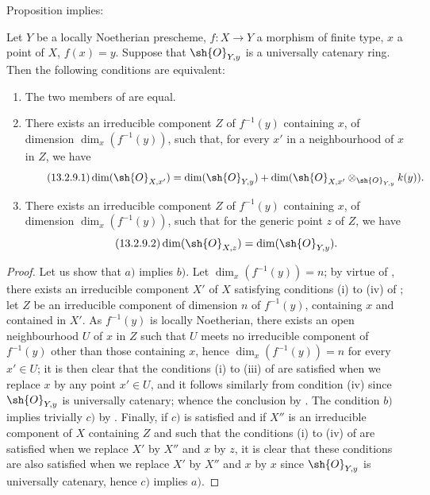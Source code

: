 Proposition  implies:

\begin{corollary}[13.2.9]
\label{IV.13.2.9}
Let $Y$ be a locally Noetherian prescheme, $f:X\to Y$ a morphism of finite type, $x$ a point of $X$, $f(x)=y$.
Suppose that $\sh{O}_{Y,y}$ is a universally catenary ring.
Then the following conditions are equivalent:
\begin{enumerate}[label=\emph{\alph*)}]
  \item The two members of  are equal.
  \item There exists an irreducible component $Z$ of $f^{-1}(y)$ containing $x$, of dimension $\dim_x(f^{-1}(y))$, such that, for every $x'$ in a neighbourhood of $x$ in $Z$, we have
  \[
  \tag{13.2.9.1}
    \dim(\sh{O}_{X,x'})=\dim(\sh{O}_{Y,y})+\dim(\sh{O}_{X,x'}\otimes_{\sh{O}_{Y,y}}k(y)).
  \]
  \item There exists an irreducible component $Z$ of $f^{-1}(y)$ containing $x$, of dimension $\dim_x(f^{-1}(y))$, such that for the generic point $z$ of $Z$, we have
  \[
  \tag{13.2.9.2}
    \dim(\sh{O}_{X,z})=\dim(\sh{O}_{Y,y}).
  \]
\end{enumerate}
\end{corollary}

\begin{proof}
Let us show that $a)$ implies $b)$.
Let $\dim_x(f^{-1}(y))=n$; by virtue of , there exists an irreducible component $X'$ of $X$ satisfying conditions (i) to (iv) of ; let $Z$ be an irreducible component of dimension $n$ of $f^{-1}(y)$, containing $x$ and contained in $X'$.
As $f^{-1}(y)$ is locally Noetherian, there exists an open neighbourhood $U$ of $x$ in $Z$ such that $U$ meets no irreducible component of $f^{-1}(y)$ other than those containing $x$, hence  $\dim_x(f^{-1}(y))=n$ for every $x'\in U$; it is then clear that the conditions (i) to (iii) of  are satisfied when we replace $x$ by any point $x'\in U$, and it follows similarly from condition (iv) since $\sh{O}_{Y,y}$ is universally catenary; whence the conclusion by .
The condition $b)$ implies trivially $c)$ by .
Finally, if $c)$ is satisfied and if $X''$ is an irreducible component of $X$ containing $Z$ and such that the conditions (i) to (iv) of  are satisfied when we replace $X'$ by $X''$ and $x$ by $z$, it is clear that these conditions are also satisfied when we replace $X'$ by $X''$ and $x$ by $x$ since $\sh{O}_{Y,y}$ is universally catenary, hence $c)$ implies $a)$.
\end{proof}

